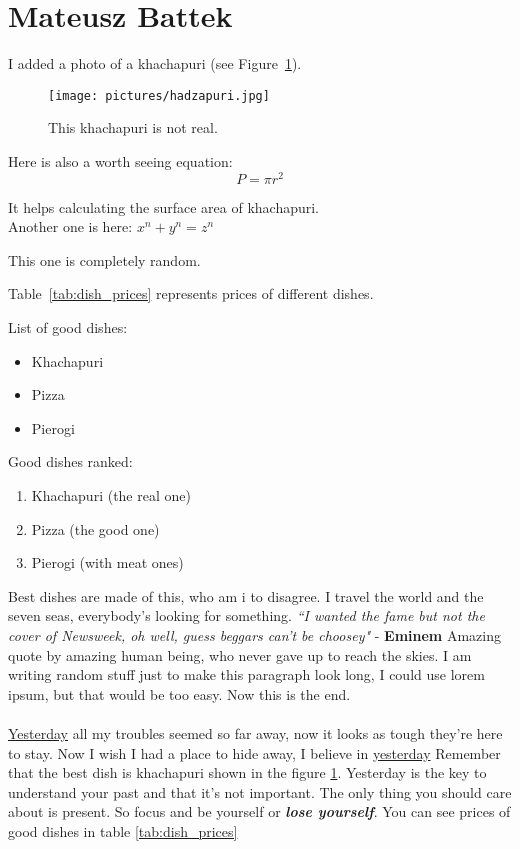 \section{Mateusz Battek}

I added a photo of a khachapuri (see Figure~\ref{fig:hadzapuri}).

\begin{figure}[h] %
    \centering
    \texttt{[image: pictures/hadzapuri.jpg]}
    \caption{This khachapuri is not real.}
    \label{fig:hadzapuri}
\end{figure}

Here is also a worth seeing equation: \[P=\pi r^2\]

It helps calculating the surface area of khachapuri.\\
Another one is here:
$ x^n + y^n = z^n $

This one is completely random.

\newpage

Table~\ref{tab:dish_prices} represents prices of different dishes.



List of good dishes:
\begin{itemize}[label=$\spadesuit$]
  \item Khachapuri
  \item Pizza
  \item Pierogi
\end{itemize}

Good dishes ranked:
\begin{enumerate}
  \item Khachapuri (the real one)
  \item Pizza (the good one)
  \item Pierogi (with meat ones)
\end{enumerate}

\begin{flushleft}
Best dishes are made of this, who am i to disagree.
I travel the world and the seven seas, everybody's looking for something.
\textit{``I wanted the fame but not the cover of Newsweek,
oh well, guess beggars can't be choosey"} - \textbf{Eminem}
Amazing quote by amazing human being, who never gave up to reach the skies.
I am writing random stuff just to make this paragraph look long,
I could use lorem ipsum, but that would be too easy. Now this is the end.
\\~\\
\underline{Yesterday} all my troubles seemed so far away,
now it looks as tough they're here to stay.
Now I wish I had a place to hide away,
I believe in \underline{yesterday}
Remember that the best dish is khachapuri shown in the figure \ref{fig:hadzapuri}.
Yesterday is the key to understand your past and that it's not important.
The only thing you should care about is present. So focus and be yourself
or \textbf{\emph{lose yourself}}. You can see prices of good dishes in table \ref{tab:dish_prices}
\end{flushleft}


